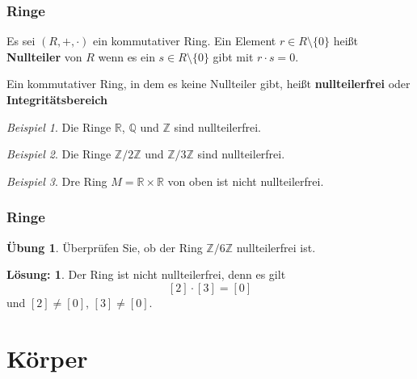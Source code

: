 \documentclass[hyperref={pdfpagelabels=false}]{beamer}
\theoremstyle{plain}%
\theoremstyle{definition}
\newtheorem*{uebung}{Übung}
\newtheorem*{sol}{Lösung:}
\theoremstyle{remark}
\newtheorem*{beispiel}{Beispiel}
\def \R{\mathbb R}
\def \Z{\mathbb Z}
\begin{document}
\begin{frame}
\frametitle{Ringe}

\begin{definition} Es sei $(R, + , \cdot)$ ein kommutativer Ring. Ein Element $r \in R \setminus \{0\}$ heißt 
\textbf{Nullteiler} von $R$ wenn es ein $s \in R \setminus \{0\}$ gibt mit $r \cdot s = 0$.

\pause
Ein kommutativer Ring, in dem es keine Nullteiler gibt, heißt \textbf{nullteilerfrei} oder \textbf{Integritätsbereich}
\end{definition}

\pause 
\begin{beispiel} Die Ringe $\mathbb R$, $\mathbb Q$ und $\mathbb Z$ sind nullteilerfrei.
\end{beispiel}

\pause 
\begin{beispiel} Die Ringe $\mathbb Z/2\Z$ und $\mathbb Z/ 3\Z$ sind nullteilerfrei. 
\end{beispiel}

\pause
\begin{beispiel}
Dre Ring $M = \R \times \R$ von oben ist nicht nullteilerfrei. 
\end{beispiel}

\end{frame}

\begin{frame}
\frametitle{Ringe}

\begin{uebung}
Überprüfen Sie, ob der Ring $\Z/6\Z$ nullteilerfrei ist. 
\end{uebung}

\bigbreak

\begin{sol}
Der Ring ist nicht nullteilerfrei, denn es gilt 
	$$ [2] \cdot [3] = [0] $$
und $[2] \neq [0]$, $[3] \neq [0]$.
\end{sol}

\end{frame}

\section{Körper}
\end{document}
